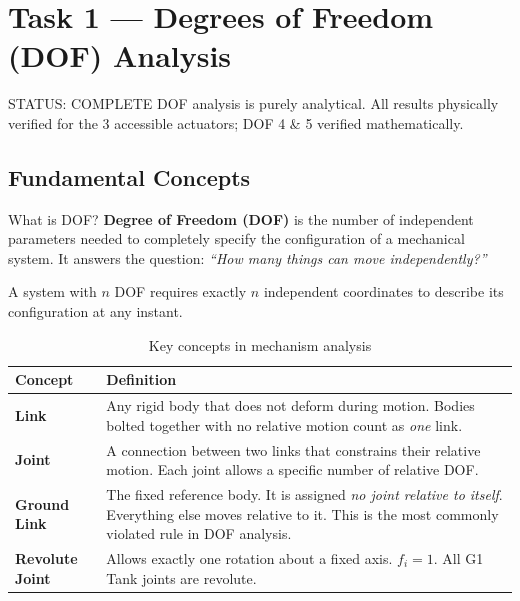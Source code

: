 \documentclass[12pt,a4paper]{article}
\begin{document}
\section{Task 1 --- Degrees of Freedom (DOF) Analysis}

\begin{donebox}{STATUS: COMPLETE }
DOF analysis is purely analytical. All results physically verified for the 3
accessible actuators; DOF 4 \& 5 verified mathematically.
\end{donebox}

\subsection{Fundamental Concepts}

\begin{conceptbox}{What is DOF?}
\textbf{Degree of Freedom (DOF)} is the number of independent parameters needed
to completely specify the configuration of a mechanical system. It answers the
question: \emph{``How many things can move independently?''}

A system with $n$ DOF requires exactly $n$ independent coordinates to describe
its configuration at any instant.
\end{conceptbox}

\vspace{6pt}

\begin{table}[h!]
\centering
\caption{Key concepts in mechanism analysis}
\renewcommand{\arraystretch}{1.3}
\begin{tabularx}{\linewidth}{L{3cm} X}
\toprule
{}
\textbf{Concept} & \textbf{Definition} \\
\midrule
\textbf{Link} & Any rigid body that does not deform during motion. Bodies bolted
  together with no relative motion count as \emph{one} link. \\
\midrule
\textbf{Joint} & A connection between two links that constrains their relative
  motion. Each joint allows a specific number of relative DOF. \\
\midrule
\textbf{Ground Link} & The fixed reference body. It is assigned \emph{no joint
  relative to itself}. Everything else moves relative to it. This is the most
  commonly violated rule in DOF analysis. \\
\midrule
\textbf{Revolute Joint} & Allows exactly one rotation about a fixed axis.
  $f_i = 1$. All G1 Tank joints are revolute. \\
\bottomrule
\end{tabularx}
\end{table}
\end{document}
